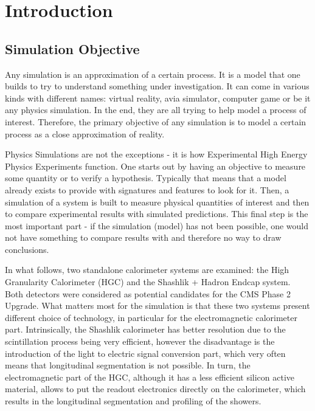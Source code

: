 \section{Introduction} \label{section:simulations_introduction}

\subsection{Simulation Objective} \label{subsection:simulations_introduction_objective}
Any simulation is an approximation of a certain process. It is a model that one builds to try to understand something under investigation. It can come in various kinds with different names: virtual reality, avia simulator, computer game or be it any physics simulation. In the end, they are all trying to help model a process of interest. Therefore, the primary objective of any simulation is to model a certain process as a close approximation of reality.

Physics Simulations are not the exceptions - it is how Experimental High Energy Physics Experiments function. One starts out by having an objective to measure some quantity or to verify a hypothesis. Typically that means that a model already exists to provide with signatures and features to look for it. Then, a simulation of a system is built to measure physical quantities of interest and then to compare experimental results with simulated predictions. This final step is the most important part - if the simulation (model) has not been possible, one would not have something to compare results with and therefore no way to draw conclusions.

In what follows, two standalone calorimeter systems are examined: the High Granularity Calorimeter (HGC) \cite{Magnan:2017exp} and the Shashlik + Hadron Endcap system. Both detectors were considered as potential candidates for the CMS Phase 2 Upgrade. What matters most for the simulation is that these two systems present different choice of technology, in particular for the electromagnetic calorimeter part. Intrinsically, the Shashlik calorimeter has better resolution due to the scintillation process being very efficient, however the disadvantage is the introduction of the light to electric signal conversion part, which very often means that longitudinal segmentation is not possible. In turn, the electromagnetic part of the HGC, although it has a less efficient silicon active material, allows to put the readout electronics directly on the calorimeter, which results in the longitudinal segmentation and profiling of the showers.

